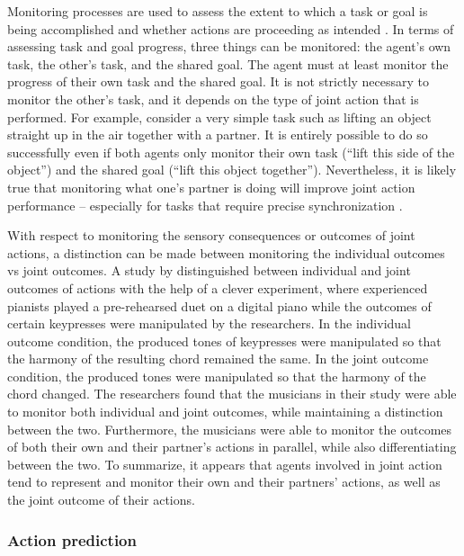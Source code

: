 \documentclass[10pt,a4paper,onecolumn]{article}
\begin{document}
Monitoring processes are used to assess the extent to which a task or goal is being accomplished and whether actions are proceeding as intended \autocite{botvinickConflictMonitoringCognitive2001}. In terms of assessing task and goal progress, three things can be monitored: the agent's own task, the other's task, and the shared goal. The agent must at least monitor the progress of their own task and the shared goal. It is not strictly necessary to monitor the other's task, and it depends on the type of joint action that is performed. For example, consider a very simple task such as lifting an object straight up in the air together with a partner. It is entirely possible to do so successfully even if both agents only monitor their own task (``lift this side of the object'') and the shared goal (``lift this object together''). Nevertheless, it is likely true that monitoring what one's partner is doing will improve joint action performance -- especially for tasks that require precise synchronization \autocite{vesperMinimalArchitectureJoint2010}.

With respect to monitoring the sensory consequences or outcomes of joint actions, a distinction can be made between monitoring the individual outcomes vs joint outcomes. A study by \textcite{loehrMonitoringIndividualJoint2013} distinguished between individual and joint outcomes of actions with the help of a clever experiment, where experienced pianists played a pre-rehearsed duet on a digital piano while the outcomes of certain keypresses were manipulated by the researchers. In the individual outcome condition, the produced tones of keypresses were manipulated so that the harmony of the resulting chord remained the same. In the joint outcome condition, the produced tones were manipulated so that the harmony of the chord changed. The researchers found that the musicians in their study were able to monitor both individual and joint outcomes, while maintaining a distinction between the two. Furthermore, the musicians were able to monitor the outcomes of both their own and their partner's actions in parallel, while also differentiating between the two. To summarize, it appears that agents involved in joint action tend to represent and monitor their own and their partners' actions, as well as the joint outcome of their actions.

\hypertarget{action-prediction}{%
\subsubsection{Action prediction}\label{action-prediction}}
\end{document}
